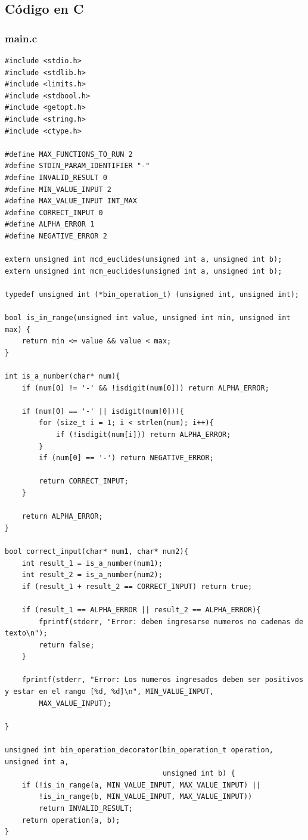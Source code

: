 \documentclass[titlepage,a4paper]{article}
\begin{document}
\subsection{Código en C}
\label{apendice:codigo_c}
\subsubsection{main.c}
\begin{lstlisting}[style=customC]
#include <stdio.h>
#include <stdlib.h>
#include <limits.h>
#include <stdbool.h>
#include <getopt.h>
#include <string.h>
#include <ctype.h>

#define MAX_FUNCTIONS_TO_RUN 2
#define STDIN_PARAM_IDENTIFIER "-"
#define INVALID_RESULT 0
#define MIN_VALUE_INPUT 2
#define MAX_VALUE_INPUT INT_MAX
#define CORRECT_INPUT 0
#define ALPHA_ERROR 1
#define NEGATIVE_ERROR 2

extern unsigned int mcd_euclides(unsigned int a, unsigned int b);
extern unsigned int mcm_euclides(unsigned int a, unsigned int b);

typedef unsigned int (*bin_operation_t) (unsigned int, unsigned int);

bool is_in_range(unsigned int value, unsigned int min, unsigned int max) {
	return min <= value && value < max;
}

int is_a_number(char* num){
	if (num[0] != '-' && !isdigit(num[0])) return ALPHA_ERROR;

	if (num[0] == '-' || isdigit(num[0])){
		for (size_t i = 1; i < strlen(num); i++){
			if (!isdigit(num[i])) return ALPHA_ERROR;
		}
		if (num[0] == '-') return NEGATIVE_ERROR;

		return CORRECT_INPUT;
	}

	return ALPHA_ERROR;
}

bool correct_input(char* num1, char* num2){
	int result_1 = is_a_number(num1);
	int result_2 = is_a_number(num2);
	if (result_1 + result_2 == CORRECT_INPUT) return true;

	if (result_1 == ALPHA_ERROR || result_2 == ALPHA_ERROR){
		fprintf(stderr, "Error: deben ingresarse numeros no cadenas de texto\n");
		return false;
	}

	fprintf(stderr, "Error: Los numeros ingresados deben ser positivos y estar en el rango [%d, %d]\n", MIN_VALUE_INPUT,
		MAX_VALUE_INPUT);

}

unsigned int bin_operation_decorator(bin_operation_t operation, unsigned int a, 
									 unsigned int b) {
	if (!is_in_range(a, MIN_VALUE_INPUT, MAX_VALUE_INPUT) || 
		!is_in_range(b, MIN_VALUE_INPUT, MAX_VALUE_INPUT))
		return INVALID_RESULT;
	return operation(a, b);
}


\end{lstlisting}
\end{document}
